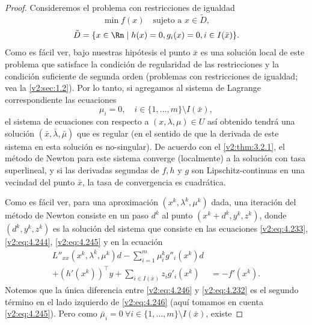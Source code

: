 \begin{proof}
Consideremos el problema con restricciones de igualdad
\[
\min f(x) \quad \text{sujeto a } x \in \tilde{D},
\]
\[
\tilde{D} = \{ x \in \Rn \mid h(x) = 0, g_i(x) = 0, i \in I(\bar{x}) \}.
\]
Como es fácil ver, bajo nuestras hipótesis el punto $\bar{x}$ es una solución local de este problema que satisface la condición de regularidad de las restricciones y la condición suficiente de segunda orden (problemas con restricciones de igualdad; vea la \cref{v2:sec:1.2}). Por lo tanto, si agregamos al sistema de Lagrange correspondiente las ecuaciones
\[
\mu_i = 0, \quad i \in \{ 1, \dots, m \} \setminus I(\bar{x}),
\]
el sistema de ecuaciones con respecto a $(x, \lambda, \mu) \in U$ así obtenido tendrá una solución $(\bar{x}, \bar{\lambda}, \bar{\mu})$ que es regular (en el sentido de que la derivada de este sistema en esta solución es no-singular). De acuerdo con el \cref{v2:thm:3.2.1}, el método de Newton para este sistema converge (localmente) a la solución con tasa superlineal, y si las derivadas segundas de $f, h$ y $g$ son Lipschitz-continuas en una vecindad del punto $\bar{x}$, la tasa de convergencia es cuadrática.

Como es fácil ver, para una aproximación $(x^k, \lambda^k, \mu^k)$ dada, una iteración del método de Newton consiste en un paso $d^k$ al punto $(x^k + d^k, y^k, z^k)$, donde $(d^k, y^k, z^k)$ es la solución del sistema que consiste en las ecuaciones \eqref{v2:eq:4.233}, \eqref{v2:eq:4.244}, \eqref{v2:eq:4.245} y en la ecuación
\begin{align}
L''_{xx}(x^k, \lambda^k, \mu^k)d - \sum_{i=1}^m \mu^k_i g''_i(x^k)d \nonumber \\
+ (h'(x^k))^\top y + \sum_{i \in I(\bar{x})} z_i g'_i(x^k) &= -f'(x^k).
\label{v2:eq:4.246}
\end{align}
Notemos que la única diferencia entre \eqref{v2:eq:4.246} y \eqref{v2:eq:4.232} es el segundo término en el lado izquierdo de \eqref{v2:eq:4.246} (aquí tomamos en cuenta \eqref{v2:eq:4.245}). Pero como $\bar{\mu}_i = 0 \ \forall i \in \{ 1, \dots, m \} \setminus I(\bar{x})$, existe


\end{proof}
